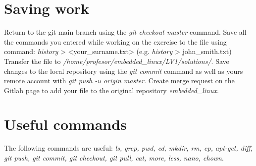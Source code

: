 \documentclass[11pt]{article}
\begin{document}
\section{Saving work}
Return to the git main branch using the \textit{git checkout master} command.
 Save all the commands you entered while working on the exercise to the file
 using command:
\newline
\newline
\textit{history} > <your\_surname.txt> (e.g. \textit{history} > john\_smith.txt)
\newline
\newline
Transfer the file to \textit{/home/profesor/embedded\_linux/LV1/solutions/}. Save
 changes to the local repository using the \textit{git commit} command as well
 as yours remote account with \textit{git push -u origin master}. Create merge
 request on the Gitlab page to add your file to the original repository
 \textit{embedded\_linux}.
\section{Useful commands}
The following commands are useful: \textit{ls, grep, pwd, cd, mkdir, rm, cp,
 apt-get, diff, git push, git commit, git checkout, git pull, cat, more, less,
 nano, chown}.
\end{document}
